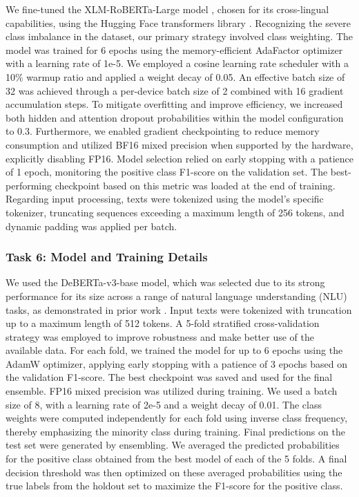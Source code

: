 \documentclass[letterpaper]{article} %
\begin{document}
We fine-tuned the XLM-RoBERTa-Large model \cite{conneau2019}, chosen for its cross-lingual capabilities, using the Hugging Face transformers library \cite{wolf-etal-2020-transformers}. Recognizing the severe class imbalance in the dataset, our primary strategy involved class weighting.
The model was trained for 6 epochs using the memory-efficient AdaFactor optimizer with a learning rate of 1e-5. We employed a cosine learning rate scheduler with a 10\% warmup ratio and applied a weight decay of 0.05. An effective batch size of 32 was achieved through a per-device batch size of 2 combined with 16 gradient accumulation steps.
To mitigate overfitting and improve efficiency, we increased both hidden and attention dropout probabilities within the model configuration to 0.3. Furthermore, we enabled gradient checkpointing to reduce memory consumption and utilized BF16 mixed precision when supported by the hardware, explicitly disabling FP16.
Model selection relied on early stopping with a patience of 1 epoch, monitoring the positive class F1-score on the validation set. The best-performing checkpoint based on this metric was loaded at the end of training. Regarding input processing, texts were tokenized using the model's specific tokenizer, truncating sequences exceeding a maximum length of 256 tokens, and dynamic padding was applied per batch.


\subsubsection{Task 6: Model and Training Details}

We used the DeBERTa-v3-base model, which was selected due to its strong performance for its size across a range of natural language understanding (NLU) tasks, as demonstrated in prior work \cite{he2021debertav3, he2021deberta}. Input texts were tokenized with truncation up to a maximum length of 512 tokens.
A 5-fold stratified cross-validation strategy was employed to improve robustness and make better use of the available data. 
For each fold, we trained the model for up to 6 epochs using the AdamW optimizer, applying early stopping with a patience of 3 epochs based on the validation F1-score. The best checkpoint was saved and used for the final ensemble. FP16 mixed precision was utilized during training.
We used a batch size of 8, with a learning rate of 2e-5 and a weight decay of 0.01. The class weights were computed independently for each fold using inverse class frequency, thereby emphasizing the minority class during training.
Final predictions on the test set were generated by ensembling. We averaged the predicted probabilities for the positive class obtained from the best model of each of the 5 folds. A final decision threshold was then optimized on these averaged probabilities using the true labels from the holdout set to maximize the F1-score for the positive class.
\end{document}
